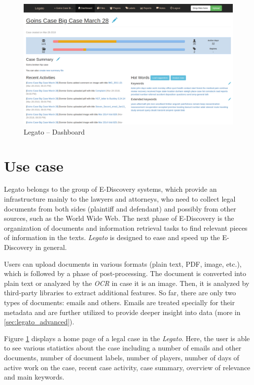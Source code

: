 \documentclass[
  digital, %
  table,   %
  lof,     %
  lot,     %
]{fithesis3}
\begin{document}
\begin{figure}[h]
\caption{Legato -- Dashboard}
\label{fig:legato_dashboard}
\includegraphics[width=\textwidth]{img/Legato-Dashboard}
\end{figure}


\section{Use case}
Legato belongs to the group of E-Discovery systems, which provide an infrastructure mainly to the lawyers and attorneys, who need to collect legal documents from both sides (plaintiff and defendant) and possibly from other sources, such as the World Wide Web.
The next phase of E-Discovery is the organization of documents and information retrieval tasks to find relevant pieces of information in the texts.
\textit{Legato} is designed to ease and speed up the E-Discovery in general.

Users can upload documents in various formats (plain text, PDF, image, etc.), which is followed by a phase of post-processing.
The document is converted into plain text or analyzed by the \textit{OCR} in case it is an image.
Then, it is analyzed by third-party libraries to extract additional features.
So far, there are only two types of documents: emails and others.
Emails are treated specially for their metadata and are further utilized to provide deeper insight into data (more in \ref{sec:legato_advanced}).

Figure \ref{fig:legato_dashboard} displays a home page of a legal case in the \textit{Legato}.
Here, the user is able to see various statistics about the case including a number of emails and other documents, number of document labels, number of players, number of days of active work on the case, recent case activity, case summary, overview of relevance and main keywords.
\end{document}
